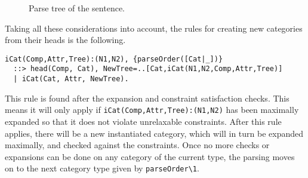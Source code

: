 \documentclass{llncs}
\newcommand{\PN}{\textit{PN}\xspace}
\newcommand{\NP}{\textit{NP}\xspace}
\newcommand{\VP}{\textit{VP}\xspace}
\newcommand{\Se}{\textit{S}\xspace}
\newcommand{\N}{\textit{N}\xspace}
\newcommand{\V}{\textit{V}\xspace}
\newcommand{\D}{\textit{D}\xspace}
\begin{document}
\begin{itemize}
\begin{figure}[H]
\begin{center}
  \caption{Parse tree of the sentence.}
  \label{fig:tree}
  \end{center}
\end{figure}
\end{itemize}

Taking all these considerations into account, the rules for creating new categories from their heads is the following.
\begin{verbatim}
iCat(Comp,Attr,Tree):(N1,N2), {parseOrder([Cat|_])}
  ::> head(Comp, Cat), NewTree=..[Cat,iCat(N1,N2,Comp,Attr,Tree)]
  | iCat(Cat, Attr, NewTree).
\end{verbatim}

This rule is found after the expansion and constraint satisfaction checks. This means it will only apply if \texttt{iCat(Comp,Attr,Tree):(N1,N2)} has been maximally expanded so that it does not violate unrelaxable constraints. After this rule applies, there will be a new instantiated category, which will in turn be expanded maximally, and checked against the constraints. Once no more checks or expansions can be done on any category of the current type, the parsing moves on to the next category type given by \texttt{parseOrder\textbackslash 1}.
\end{document}
